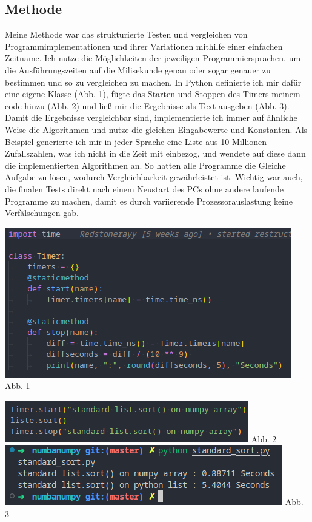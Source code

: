 \documentclass[12pt,a4paper]{article}
\begin{document}
\subsection{Methode}

Meine Methode war das strukturierte Testen und vergleichen von Programmimplementationen und ihrer 
Variationen mithilfe einer einfachen Zeitname. Ich nutze die Möglichkeiten der jeweiligen Programmiersprachen, 
um die Ausführungszeiten auf die Milisekunde genau oder sogar genauer zu bestimmen und 
so zu vergleichen zu machen. In Python definierte ich mir dafür eine eigene Klasse (Abb. 1), fügte das Starten und Stoppen
des Timers meinem code hinzu (Abb. 2) und ließ mir die Ergebnisse als Text ausgeben (Abb. 3).
Damit die Ergebnisse vergleichbar sind, implementierte ich immer auf ähnliche Weise die Algorithmen und
nutze die gleichen Eingabewerte und Konstanten.
Als Beispiel generierte ich mir in jeder Sprache eine Liste aus 10 Millionen Zufallszahlen,
was ich nicht in die Zeit mit einbezog, und wendete auf diese dann die implementierten Algorithmen an.
So hatten alle Programme die Gleiche Aufgabe zu lösen, wodurch Vergleichbarkeit gewährleistet ist.
Wichtig war auch, die finalen Tests direkt nach einem Neustart des PCs ohne andere laufende Programme
zu machen, damit es durch variierende Prozessorauslastung keine Verfälschungen gab. 

\clearpage

\normalsize \begin{multicols}{2}
    \begin{center}
        \includegraphics[width=.5\textwidth]{screenshots/pythontimer.png}
        Abb. 1
    \end{center}

    \columnbreak
    
    \begin{center}
        \includegraphics[width=.5\textwidth]{screenshots/timerexample.png}
        Abb. 2
        \includegraphics[width=.5\textwidth]{screenshots/outputexample.png}
        Abb. 3
    \end{center}



\end{multicols}
\end{document}
